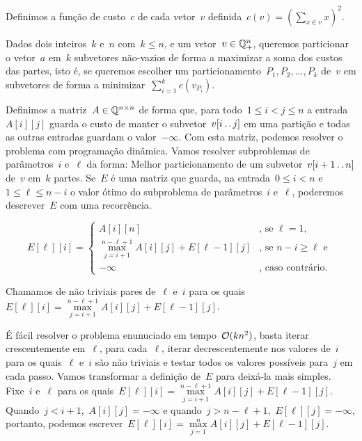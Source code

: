 \begin{prob} \label{prob:Monge_ex}
Definimos a função de custo~$c$ de cada vetor~$v$ definida~$c(v) = \left( \sum \limits_{x \in v} x \right)^2$.  

Dados dois inteiros~$k$ e~$n$ com~$k \leq n$, e um vetor~$v \in \mathbb{Q}_+^n$, queremos particionar o vetor~$a$ em~$k$ subvetores não-vazios de forma a maximizar a soma dos custos das partes, isto é, se queremos escolher um particionamento~$P_1,P_2,\dots,P_k$ de~$v$ em subvetores de forma a minimizar~$\sum \limits_{i=1}^k c(v_{P_i})$.
\end{prob}

Definimos a matriz~$A \in \mathbb{Q}^{n \times n}$ de forma que, para todo~$1 \leq i < j \leq n$ a entrada~$A[i][j]$ guarda o custo de manter o subvetor~$v[i \,.\,.\, j]$ em uma partição e todas as outras entradas guardam o valor~$-\infty$. Com esta matriz, podemos resolver o problema com programação dinâmica. Vamos resolver subproblemas de parâmetros~$i$ e~$\ell$ da forma: Melhor particionamento de um subvetor~$v[i+1 \,.\,.\, n]$ de~$v$ em~$k$ partes. Se~$E$ é uma matriz que guarda, na entrada~$0 \leq i < n$ e~$1 \leq \ell \leq n - i$ o valor ótimo do subproblema de parâmetros~$i$ e~$\ell$, poderemos descrever~$E$ com uma recorrência.

\begin{equation*}
E[\ell][i] = \begin{cases}
    A[i][n]                                                 & \text{, se } \ell = 1 \text{,} \\
    \max\limits_{j=i+1}^{n-\ell+1} A[i][j] + E[\ell-1][j]   & \text{, se } n - i \geq \ell \text{ e } \\
    -\infty                                                 & \text{, caso contrário.}
\end{cases}
\end{equation*}

Chamamos de não triviais pares de~$\ell$ e~$i$ para os quais~$E[\ell][i] = \max\limits_{j=i+1}^{n-\ell+1} A[i][j] + E[\ell-1][j]$. 

É fácil resolver o problema enunuciado em tempo~$\mathcal{O}(kn^2)$, basta iterar crescentemente em~$\ell$, para cada~$\ell$, iterar decrescentemente nos valores de~$i$ para os quais~$\ell$ e~$i$ são não triviais e testar todos os valores possíveis para~$j$ em cada passo. Vamos transformar a definição de~$E$ para deixá-la mais simples. Fixe~$i$ e~$\ell$ para os quais~${E[\ell][i] = \max\limits_{j=i+1}^{n-\ell+1} A[i][j] + E[\ell-1][j]}$. Quando~$j < i+1$,~$A[i][j] = -\infty$ e quando~$j > n-\ell+1$,~$E[\ell][j] = -\infty$, portanto, podemos escrever~${E[\ell][i] = \max\limits_{j=1}^n A[i][j] + E[\ell-1][j]}$.  

